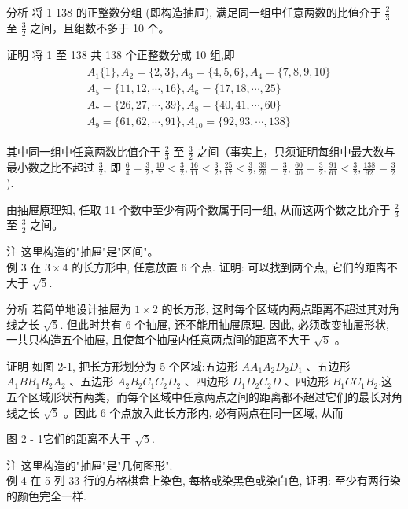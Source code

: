 \documentclass[10pt]{article}
\begin{document}
分析 将 1 138 的正整数分组 (即构造抽屉), 满足同一组中任意两数的比值介于 $\frac{2}{3}$ 至 $\frac{3}{2}$ 之间，且组数不多于 10 个。

证明 将 1 至 138 共 138 个正整数分成 10 组,即\\
\begin{align*}
\begin{aligned}
& A_{1}\{1\}, A_{2}=\{2,3\}, A_{3}=\{4,5,6\}, A_{4}=\{7,8,9,10\} \\
& A_{5}=\{11,12, \cdots, 16\}, A_{6}=\{17,18, \cdots, 25\} \\
& A_{7}=\{26,27, \cdots, 39\}, A_{8}=\{40,41, \cdots, 60\} \\
& A_{9}=\{61,62, \cdots, 91\}, A_{10}=\{92,93, \cdots, 138\}
\end{aligned}
\end{align*}

其中同一组中任意两数比值介于 $\frac{2}{3}$ 至 $\frac{3}{2}$ 之间（事实上，只须证明每组中最大数与最小数之比不超过 $\frac{3}{2}$, 即 $\frac{6}{4}=\frac{3}{2}, \frac{10}{7}<\frac{3}{2}, \frac{16}{11}<\frac{3}{2}, \frac{25}{17}<\frac{3}{2}, \frac{39}{26}=\frac{3}{2}$, $\frac{60}{40}=\frac{3}{2}, \frac{91}{61}<\frac{3}{2}, \frac{138}{92}=\frac{3}{2}$ ).

由抽屉原理知, 任取 11 个数中至少有两个数属于同一组, 从而这两个数之比介于 $\frac{2}{3}$ 至 $\frac{3}{2}$ 之间。

注 这里构造的"抽屉"是"区间"。\\
例 3 在 $3 \times 4$ 的长方形中, 任意放置 6 个点. 证明: 可以找到两个点, 它们的距离不大于 $\sqrt{5}$.

分析 若简单地设计抽屉为 $1 \times 2$ 的长方形, 这时每个区域内两点距离不超过其对角线之长 $\sqrt{5}$. 但此时共有 6 个抽屉, 还不能用抽屉原理. 因此, 必须改变抽屉形状, 一共只构造五个抽屉, 且使每个抽屉内任意两点间的距离不大于 $\sqrt{5}$ 。

证明 如图 2-1, 把长方形划分为 5 个区域:五边形 $A A_{1} A_{2} D_{2} D_{1}$ 、五边形 $A_{1} B B_{1} B_{2} A_{2}$ 、五边形 $A_{2} B_{2} C_{1} C_{2} D_{2}$ 、四边形 $D_{1} D_{2} C_{2} D$ 、四边形 $B_{1} C C_{1} B_{2}$.这五个区域形状有两类，而每个区域中任意两点之间的距离都不超过它们的最长对角线之长 $\sqrt{5}$ 。因此 6 个点放入此长方形内, 必有两点在同一区域, 从而

图 2 - 1它们的距离不大于 $\sqrt{5}$.

注 这里构造的"抽屉"是"几何图形".\\
例 4 在 5 列 33 行的方格棋盘上染色, 每格或染黑色或染白色, 证明: 至少有两行染的颜色完全一样.
\end{document}
